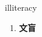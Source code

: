 
\begin{frame}
{\huge illiteracy}
\begin{center}
\begin{enumerate}\Large
  \item \textbf{文盲}
\end{enumerate}
\end{center}
\end{frame}
